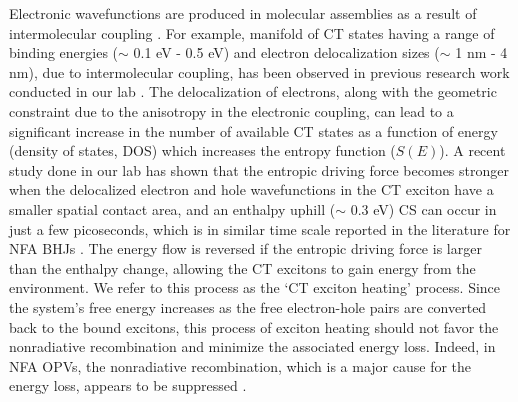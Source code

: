 \documentclass[12pt]{article}
\begin{document}
Electronic wavefunctions are produced in molecular assemblies as a result of intermolecular coupling \cite{bredas2004charge,scholes2006erratum}. For example, manifold of CT states having a range of binding energies ($\sim$ 0.1 eV - 0.5 eV) and electron delocalization sizes ($\sim$ 1 nm - 4 nm), due to intermolecular coupling, has been observed in previous research work conducted in our lab \cite{wang2017multidimensional}. The delocalization of electrons, along with the geometric constraint due to the anisotropy in the electronic coupling, can lead to a significant increase in the number of available CT states as a function of energy (density of states, DOS) which increases the entropy function ($S(E)$). A recent study done in our lab has shown that the entropic driving force becomes stronger when the delocalized electron and hole wavefunctions in the CT exciton have a smaller spatial contact area, and an enthalpy uphill ($\sim$ 0.3 eV) CS can occur in just a few picoseconds, which is in similar time scale reported in the literature for NFA BHJs \cite{kafle2020spontaneous}. The energy flow is reversed if the entropic driving force is larger than the enthalpy change, allowing the CT excitons to gain energy from the environment. We refer to this process as the \lq{CT exciton heating}' process. Since the system's free energy increases as the free electron-hole pairs are converted back to the bound excitons, this process of exciton heating should not favor the nonradiative recombination and minimize the associated energy loss. Indeed, in NFA OPVs, the nonradiative recombination, which is a major cause for the energy loss, appears to be suppressed \cite{ostroverkhova2016organic}.
\end{document}
